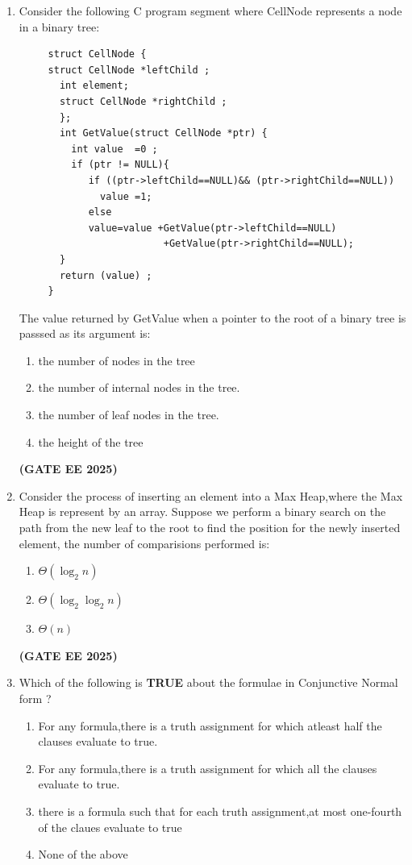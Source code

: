 \documentclass[journal,12pt,onecolumn]{IEEEtran}
\theoremstyle{remark}
\begin{document}
\begin {center}
\begin{enumerate}
 \item Consider the following C program segment where CellNode represents a node in a binary tree:
 \begin{verbatim}
     struct CellNode {
     struct CellNode *leftChild ;
       int element;
       struct CellNode *rightChild ;
       };
       int GetValue(struct CellNode *ptr) {
         int value  =0 ;
         if (ptr != NULL){
            if ((ptr->leftChild==NULL)&& (ptr->rightChild==NULL))
              value =1;
            else 
            value=value +GetValue(ptr->leftChild==NULL)
                         +GetValue(ptr->rightChild==NULL);
       }
       return (value) ;
     }
 \end{verbatim}
 The value returned by GetValue when a pointer to the root of a binary tree is passsed as its argument is:
 \begin{enumerate}
     \item  the number of nodes in the tree
     \item the number of internal nodes in the tree.
     \item the number of leaf nodes in the tree.
     \item the height of the tree
 \end{enumerate}
 \hfill \textbf{(GATE EE 2025)}
 \item Consider the process of inserting an element into a Max Heap,where the Max Heap is represent by an array. Suppose we perform a binary search on the path from the new leaf to the root to find the position for the newly inserted  element, the number of comparisions performed is:
 \begin{enumerate}
 \item $\Theta(\log_2 n)$
    \item $\Theta(\log_2 \log_2 n)$
    \item $\Theta(n)$
 \end{enumerate}
 \hfill \textbf{(GATE EE 2025)}
 \item Which of the following is \textbf{TRUE} about the formulae in Conjunctive Normal form ?
 \begin{enumerate}
     \item For any formula,there is a truth assignment for which atleast half the clauses evaluate to true.
     \item For any formula,there is a truth assignment for which all the clauses evaluate to true.
     \item there is a formula such that for each truth assignment,at most one-fourth of the claues evaluate to true
     \item None of the above
     

\end{enumerate}
\end{enumerate}
\end{center}
\end{document}
